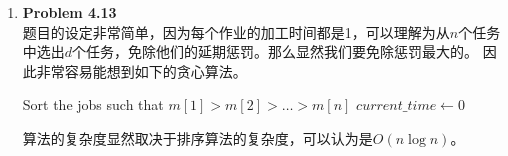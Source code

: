 \documentclass{ctexart}
\begin{document}
\begin{enumerate}[label=\arabic*.]
        对于$A$和$B$当事双方，通过简单的代数计算可知，它们俩完成时间之和减少了$t(A)-t(B)$。\\
        因此，这次交换使得所有任务的总完成时间严格减少了$(k+1)(t(A)-t(B)) > 0$。这意味着任何存在逆序对的调度方案都可以通过交换变得更优。由此推导，任意最优解可以通过有限次消除逆序对的交换操作，最终变成完全没有逆序对的贪心解$S^*$，且总时间不会变差。因此贪心策略正确。
    \item \textbf{Problem 4.13}\\
        题目的设定非常简单，因为每个作业的加工时间都是1，可以理解为从$n$个任务中选出$d$个任务，免除他们的延期惩罚。那么显然我们要免除惩罚最大的。
        因此非常容易能想到如下的贪心算法。\\
        \begin{algorithm}[H]
            \caption{贪心法求解最小总罚款调度问题}
            Sort the jobs such that $m[1] > m[2] > \dots > m[n]$\;
            $current\_time \leftarrow 0$\;
            \;
        \end{algorithm}
        算法的复杂度显然取决于排序算法的复杂度，可以认为是$O(n\log{n})$。
        

\end{enumerate}
\end{document}
